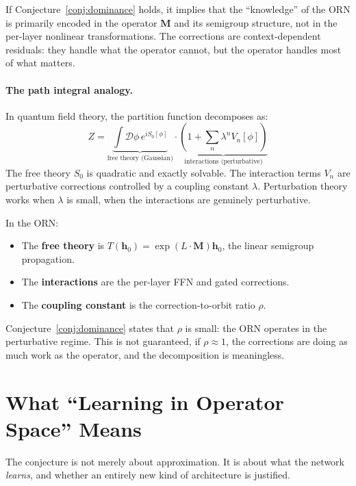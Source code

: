\documentclass[11pt, a4paper]{article}
\newcommand{\M}{\mathbf{M}}
\newcommand{\h}{\mathbf{h}}
\theoremstyle{plain}
\theoremstyle{definition}
\theoremstyle{remark}
\begin{document}
If Conjecture~\ref{conj:dominance} holds, it implies that the ``knowledge'' of the ORN is primarily encoded in the operator $\M$ and its semigroup structure, not in the per-layer nonlinear transformations.
The corrections are context-dependent residuals: they handle what the operator cannot, but the operator handles most of what matters.

\paragraph{The path integral analogy.}
In quantum field theory, the partition function decomposes as:
\begin{equation}
Z = \underbrace{\int \mathcal{D}\phi \, e^{iS_0[\phi]}}_{\text{free theory (Gaussian)}} \cdot \underbrace{\left(1 + \sum_n \lambda^n V_n[\phi]\right)}_{\text{interactions (perturbative)}}
\end{equation}
The free theory $S_0$ is quadratic and exactly solvable.
The interaction terms $V_n$ are perturbative corrections controlled by a coupling constant $\lambda$.
Perturbation theory works when $\lambda$ is small, when the interactions are genuinely perturbative.

In the ORN:
\begin{itemize}[nosep]
\item The \textbf{free theory} is $T(\h_0) = \exp(L \cdot \M) \h_0$, the linear semigroup propagation.
\item The \textbf{interactions} are the per-layer FFN and gated corrections.
\item The \textbf{coupling constant} is the correction-to-orbit ratio $\rho$.
\end{itemize}

Conjecture~\ref{conj:dominance} states that $\rho$ is small: the ORN operates in the perturbative regime.
This is not guaranteed, if $\rho \approx 1$, the corrections are doing as much work as the operator, and the decomposition is meaningless.


\section{What ``Learning in Operator Space'' Means}

The conjecture is not merely about approximation.
It is about what the network \emph{learns}, and whether an entirely new kind of architecture is justified.
\end{document}

